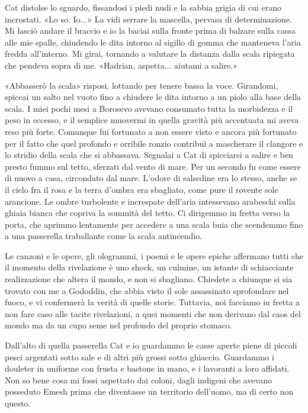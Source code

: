 Cat distolse lo sguardo, fissandosi i piedi nudi e la sabbia grigia di
cui erano incrostati. «Lo so. Io...» La vidi serrare la mascella,
pervasa di determinazione. Mi lasciò andare il braccio e io la baciai
sulla fronte prima di balzare sulla cassa alle mie spalle, chiudendo le
dita intorno al sigillo di gomma che manteneva l'aria fredda
all'interno. Mi girai, tornando a valutare la distanza dalla scala
ripiegata che pendeva sopra di me. «Hadrian, aspetta... aiutami a
salire.»

«Abbasserò la scala» risposi, lottando per tenere bassa la voce.
Girandomi, spiccai un salto nel vuoto fino a chiudere le dita intorno a
un piolo alla base della scala. I miei pochi mesi a Borosevo avevano
consumato tutta la morbidezza e il peso in eccesso, e il semplice
muovermi in quella gravità più accentuata mi aveva reso più forte.
Comunque fui fortunato a non essere visto e ancora più fortunato per il
fatto che quel profondo e orribile ronzio contribuì a mascherare il
clangore e lo stridio della scala che si abbassava. Segnalai a Cat di
spicciarsi a salire e ben presto fummo sul tetto, sferzati dal vento di
mare. Per un secondo fu come essere di nuovo a casa, circondato dal
mare. L'odore di salsedine era lo stesso, anche se il cielo fra il rosa
e la terra d'ombra era sbagliato, come pure il rovente sole arancione.
Le ombre turbolente e increspate dell'aria intessevano arabeschi sulla
ghiaia bianca che copriva la sommità del tetto. Ci dirigemmo in fretta
verso la porta, che aprimmo lentamente per accedere a una scala buia che
scendemmo fino a una passerella traballante come la scala antincendio.

Le canzoni e le opere, gli ologrammi, i poemi e le opere epiche
affermano tutti che il momento della rivelazione è uno shock, un
culmine, un istante di schiacciante realizzazione che altera il mondo, e
non si sbagliano. Chiedete a chiunque si sia trovato con me a Gododdin,
che abbia visto il sole assassinato sprofondare nel fuoco, e vi
confermerà la verità di quelle storie. Tuttavia, noi facciamo in fretta
a non fare caso alle tacite rivelazioni, a quei momenti che non derivano
dal caos del mondo ma da un cupo seme nel profondo del proprio stomaco.

Dall'alto di quella passerella Cat e io guardammo le casse aperte piene
di piccoli pesci argentati sotto sale e di altri più grossi sotto
ghiaccio. Guardammo i douleter in uniforme con frusta e bastone in mano,
e i lavoranti a loro affidati. Non so bene cosa mi fossi aspettato dai
coloni, dagli indigeni che avevano posseduto Emesh prima che diventasse
un territorio dell'uomo, ma di certo non questo.

